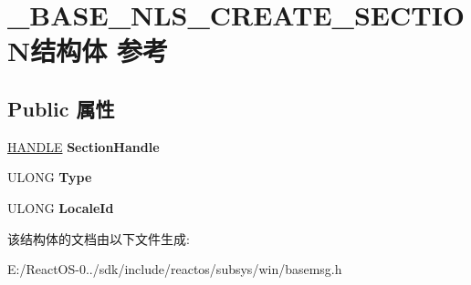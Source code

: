 \hypertarget{struct___b_a_s_e___n_l_s___c_r_e_a_t_e___s_e_c_t_i_o_n}{}\section{\+\_\+\+B\+A\+S\+E\+\_\+\+N\+L\+S\+\_\+\+C\+R\+E\+A\+T\+E\+\_\+\+S\+E\+C\+T\+I\+O\+N结构体 参考}
\label{struct___b_a_s_e___n_l_s___c_r_e_a_t_e___s_e_c_t_i_o_n}
\subsection*{Public 属性}
\begin{DoxyCompactItemize}
\item 
\mbox{\label{struct___b_a_s_e___n_l_s___c_r_e_a_t_e___s_e_c_t_i_o_n_a5e485bc1ffed75010d11afc5126d54c3}} 
\hyperlink{interfacevoid}{H\+A\+N\+D\+LE} {\bfseries Section\+Handle}
\item 
\mbox{\label{struct___b_a_s_e___n_l_s___c_r_e_a_t_e___s_e_c_t_i_o_n_a02ab31dd356cc6c54bdaa553b7762b5d}} 
U\+L\+O\+NG {\bfseries Type}
\item 
\mbox{\label{struct___b_a_s_e___n_l_s___c_r_e_a_t_e___s_e_c_t_i_o_n_a4615fa3101710ed166034a2833a6d559}} 
U\+L\+O\+NG {\bfseries Locale\+Id}
\end{DoxyCompactItemize}


该结构体的文档由以下文件生成\+:\begin{DoxyCompactItemize}
\item 
E\+:/\+React\+O\+S-\/0../sdk/include/reactos/subsys/win/basemsg.\+h\end{DoxyCompactItemize}
